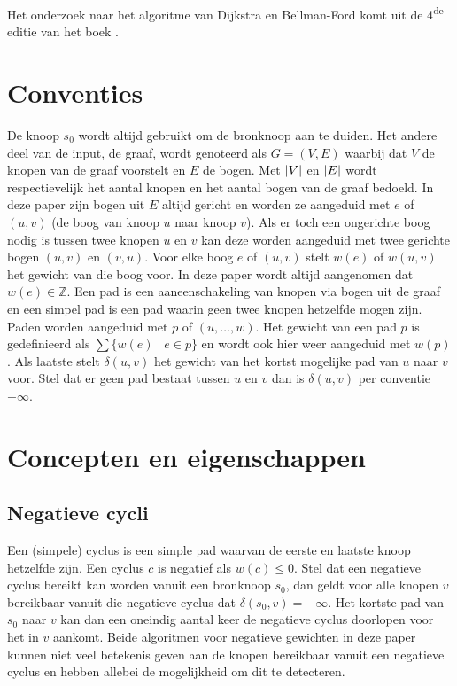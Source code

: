 \documentclass[conference]{IEEEtran}
\theoremstyle{definition}
\theoremstyle{remark}
\DeclarePairedDelimiter{\card}{\vert}{\vert}  %
\begin{document}
Het onderzoek naar het algoritme van Dijkstra en Bellman-Ford komt uit de 4\textsuperscript{de} editie van het boek  \cite{Introduction}.

\section{Conventies}
De knoop $s_0$ wordt altijd gebruikt om de bronknoop aan te duiden. Het andere deel van de input, de graaf, wordt genoteerd als $G = (V, E)$ waarbij dat $V$ de knopen van de graaf voorstelt en $E$ de bogen. Met $\card{V}$ en $\card{E}$ wordt respectievelijk het aantal knopen en het aantal bogen van de graaf bedoeld. In deze paper zijn bogen uit $E$ altijd gericht en worden ze aangeduid met $e$ of $(u, v)$ (de boog van knoop $u$ naar knoop $v$). Als er toch een ongerichte boog nodig is tussen twee knopen $u$ en $v$ kan deze worden aangeduid met twee gerichte bogen $(u, v)$ en $(v, u)$. Voor elke boog $e$ of $(u, v)$ stelt $w(e)$ of $w(u, v)$ het gewicht van die boog voor. In deze paper wordt altijd aangenomen dat $w(e) \in \mathbb{Z}$.
Een pad is een aaneenschakeling van knopen via bogen uit de graaf en een simpel pad is een pad waarin geen twee knopen hetzelfde mogen zijn. Paden worden aangeduid met $p$ of $(u, \dots, w)$. Het gewicht van een pad $p$ is gedefinieerd als $\sum\{w(e) \mid e \in p\}$ en wordt ook hier weer aangeduid met $w(p)$. Als laatste stelt $\delta(u, v)$ het gewicht van het kortst mogelijke pad van $u$ naar $v$ voor. Stel dat er geen pad bestaat tussen $u$ en $v$ dan is $\delta(u, v)$ per conventie $+ \infty$.

\section{Concepten en eigenschappen}
\subsection{Negatieve cycli}
Een (simpele) cyclus is een simple pad waarvan de eerste en laatste knoop hetzelfde zijn. Een cyclus $c$ is negatief als $w(c) \leq 0$. Stel dat een negatieve cyclus bereikt kan worden vanuit een bronknoop $s_0$, dan geldt voor alle knopen $v$ bereikbaar vanuit die negatieve cyclus dat $\delta(s_0, v) = - \infty$. Het kortste pad van $s_0$ naar $v$ kan dan een oneindig aantal keer de negatieve cyclus doorlopen voor het in $v$ aankomt. Beide algoritmen voor negatieve gewichten in deze paper kunnen niet veel betekenis geven aan de knopen bereikbaar vanuit een negatieve cyclus en hebben allebei de mogelijkheid om dit te detecteren.
\end{document}

